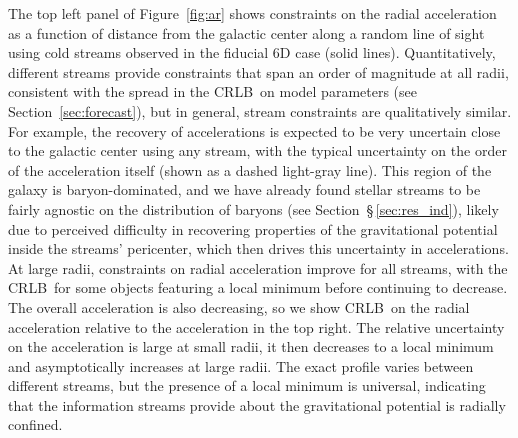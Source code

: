 \documentclass[modern]{aastex61}
\newcommand{\acronym}[1]{{\small{#1}}}
\newcommand{\CRLB}{\acronym{CRLB}}
\begin{document}
The top left panel of Figure~\ref{fig:ar} shows constraints on the radial acceleration as a function of distance from the galactic center along a random line of sight using cold streams observed in the fiducial 6D case (solid lines).
Quantitatively, different streams provide constraints that span an order of magnitude at all radii, consistent with the spread in the \CRLB\ on model parameters (see Section~\ref{sec:forecast}), but in general, stream constraints are qualitatively similar.
For example, the recovery of accelerations is expected to be very uncertain close to the galactic center using any stream, with the typical uncertainty on the order of the acceleration itself (shown as a dashed light-gray line).
This region of the galaxy is baryon-dominated, and we have already found stellar streams to be fairly agnostic on the distribution of baryons (see Section~\S\,\ref{sec:res_ind}), likely due to perceived difficulty in recovering properties of the gravitational potential inside the streams' pericenter, which then drives this uncertainty in accelerations.
At large radii, constraints on radial acceleration improve for all streams, with the \CRLB\ for some objects featuring a local minimum before continuing to decrease.
The overall acceleration is also decreasing, so we show \CRLB\ on the radial acceleration relative to the acceleration in the top right.
The relative uncertainty on the acceleration is large at small radii, it then decreases to a local minimum and asymptotically increases at large radii.
The exact profile varies between different streams, but the presence of a local minimum is universal, indicating that the information streams provide about the gravitational potential is radially confined.
\end{document}

